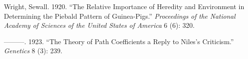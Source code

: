 \documentclass[
  singlecolumn]{report}
\newlength{\cslhangindent}
\newlength{\cslentryspacingunit} %
\newenvironment{CSLReferences}[2] %
 {%
  \setlength{\parindent}{0pt}
  \ifodd #1
  \let\oldpar\par
  \def\par{\hangindent=\cslhangindent\oldpar}
  \fi
  \setlength{\parskip}{#2\cslentryspacingunit}
 }%
 {}
\begin{document}
\begin{CSLReferences}{1}{0}
\leavevmode{}%
Wright, Sewall. 1920. {``The Relative Importance of Heredity and
Environment in Determining the Piebald Pattern of Guinea-Pigs.''}
\emph{Proceedings of the National Academy of Sciences of the United
States of America} 6 (6): 320.

\leavevmode{}%
---------. 1923. {``The Theory of Path Coefficients a Reply to Niles's
Criticism.''} \emph{Genetics} 8 (3): 239.

\end{CSLReferences}
\end{document}
